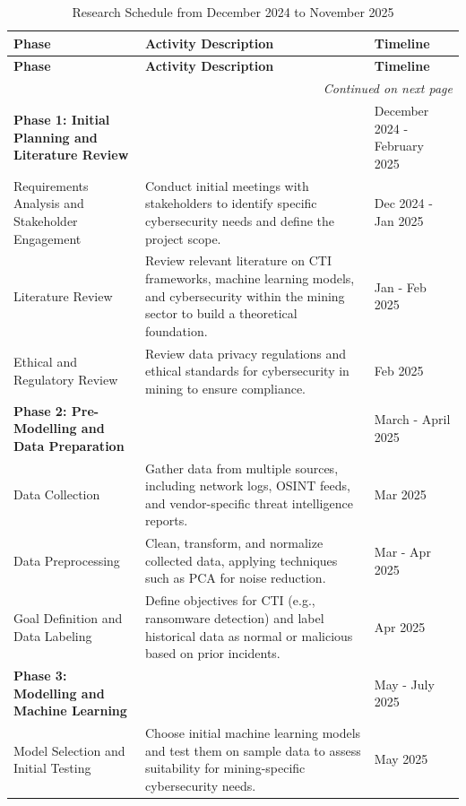 \documentclass[a4paper,twoside,12pt]{report}
\begin{document}
\begin{longtable}{|p{4cm}|p{9.5cm}|p{2.5cm}|}
    \caption{Research Schedule from December 2024 to November 2025} \label{table:schedule_of_work} \\
    \hline
    \textbf{Phase} & \textbf{Activity Description} & \textbf{Timeline} \\
    \hline\hline
    \endfirsthead

    \hline
    \textbf{Phase} & \textbf{Activity Description} & \textbf{Timeline} \\
    \hline\hline
    \endhead

    \hline \multicolumn{3}{r}{\textit{Continued on next page}} \\
    \endfoot

    \hline
    \endlastfoot

    \textbf{Phase 1: Initial Planning and Literature Review} & & December 2024 - February 2025 \\
    \hline
    Requirements Analysis and Stakeholder Engagement & Conduct initial meetings with stakeholders to identify specific cybersecurity needs and define the project scope. & Dec 2024 - Jan 2025 \\
    \hline
    Literature Review & Review relevant literature on CTI frameworks, machine learning models, and cybersecurity within the mining sector to build a theoretical foundation. & Jan - Feb 2025 \\
    \hline
    Ethical and Regulatory Review & Review data privacy regulations and ethical standards for cybersecurity in mining to ensure compliance. & Feb 2025 \\
    \hline
    \textbf{Phase 2: Pre-Modelling and Data Preparation} & & March - April 2025 \\
    \hline
    Data Collection & Gather data from multiple sources, including network logs, OSINT feeds, and vendor-specific threat intelligence reports. & Mar 2025 \\
    \hline
    Data Preprocessing & Clean, transform, and normalize collected data, applying techniques such as PCA for noise reduction. & Mar - Apr 2025 \\
    \hline
    Goal Definition and Data Labeling & Define objectives for CTI (e.g., ransomware detection) and label historical data as normal or malicious based on prior incidents. & Apr 2025 \\
    \hline
    \textbf{Phase 3: Modelling and Machine Learning} & & May - July 2025 \\
    \hline
    Model Selection and Initial Testing & Choose initial machine learning models and test them on sample data to assess suitability for mining-specific cybersecurity needs. & May 2025 \\

\end{longtable}
\end{document}
